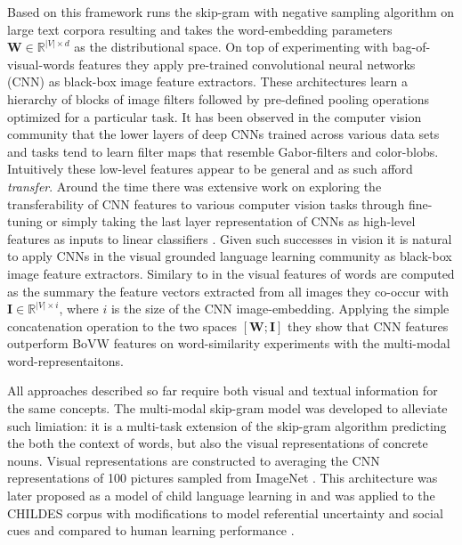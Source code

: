 Based on this framework \cite{kiela2014learning} runs the skip-gram with negative sampling algorithm
on large text corpora resulting and takes the word-embedding parameters
$\mathbf{W} \in \mathbb{R}^{|V| \times d}$ as the distributional space. On top of experimenting with
bag-of-visual-words features they apply pre-trained convolutional neural networks (CNN) as black-box image
feature extractors. These architectures learn a hierarchy of blocks of image filters followed by
pre-defined pooling operations optimized for a particular task.
It has been observed in the computer vision community that the lower layers of
deep CNNs trained across various data sets and tasks tend to learn filter maps
that resemble Gabor-filters and color-blobs. Intuitively these low-level features appear to be general
and as such afford \emph{transfer}. Around the time there was extensive work on exploring the transferability
of CNN features to various computer vision tasks through fine-tuning
 \cite{donahue2014decaf,oquab2014learning} or simply taking the last layer representation of CNNs
as high-level features as inputs to linear classifiers \cite{girshick2014rich,sharif2014cnn}.
Given such successes in vision it is natural to apply CNNs in the visual grounded language learning
community as black-box image feature extractors. Similary to \cite{bruni2014multimodal} in
\cite{kiela2014learning} the visual features of words are computed as the summary the feature vectors
extracted from all images they co-occur with $\mathbf{I} \in \mathbb{R}^{|V| \times i}$, where $i$ is
the size of the CNN image-embedding.
Applying the simple concatenation operation to the two spaces $[\mathbf{W};\mathbf{I}]$
they show that CNN features outperform BoVW features on word-similarity experiments with the multi-modal
word-representaitons.

All approaches described so far require both visual and textual information for the same concepts.
The multi-modal skip-gram \cite{lazaridou2015combining} model was developed to alleviate such limiation:
it is a multi-task extension of the skip-gram algorithm predicting the both the context of words, but also
the visual representations of concrete nouns. Visual representations are constructed to averaging
the CNN representations \cite{krizhevsky2012imagenet} of 100 pictures sampled from ImageNet \cite{deng2009imagenet}.
This architecture was later proposed as a model of child language learning in and
was applied to the CHILDES corpus \cite{macwhinney2014childes} with modifications to model referential
uncertainty and social cues \cite{lazaridou2016multimodal} and compared to human learning performance \cite{lazaridou2017multimodal}.

